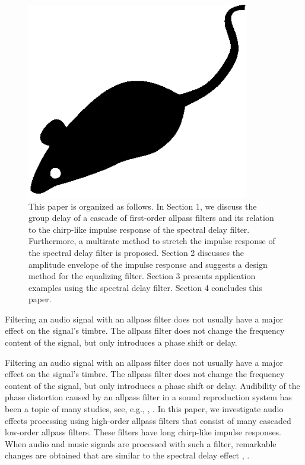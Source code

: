 \documentclass{aes2e}
\begin{document}
\begin{figure}
\centering
\includegraphics[width=23pc]{aes2e-mouse.eps}
\caption{This paper is organized as follows. In Section 1, we discuss the group delay of a cascade of first-order allpass filters and its relation to the chirp-like impulse response of the spectral delay filter. Furthermore, a multirate method to stretch the impulse response of the spectral delay filter is proposed. Section 2 discusses the amplitude envelope of the impulse response and suggests a design method for the equalizing filter. Section 3 presents application examples using the spectral delay filter. Section 4 concludes this paper.}
\end{figure}
Filtering an audio signal with an allpass filter does not usually have a major effect on the signal's timbre. The allpass filter does not change the frequency content of the signal, but only introduces a phase shift or delay.
\begin{extract}
Filtering an audio signal with an allpass filter does not usually have
a major effect on the signal's timbre. The allpass filter does not
change the frequency content of the signal, but only introduces a
phase shift or delay. Audibility of the phase distortion caused by an
allpass filter in a sound reproduction system has been a topic of many
studies, see, e.g., \cite{DEK1}, \cite{DEK2}. In this paper, we
investigate audio effects \nobreak processing using high-order allpass filters that consist of many cascaded low-order allpass filters. These filters have long chirp-like impulse responses. When audio and music signals are processed with such a filter, remarkable changes are obtained that are similar to the spectral delay effect  \cite{DEK3}, \cite{DEK4}.
\end{extract}
\end{document}

